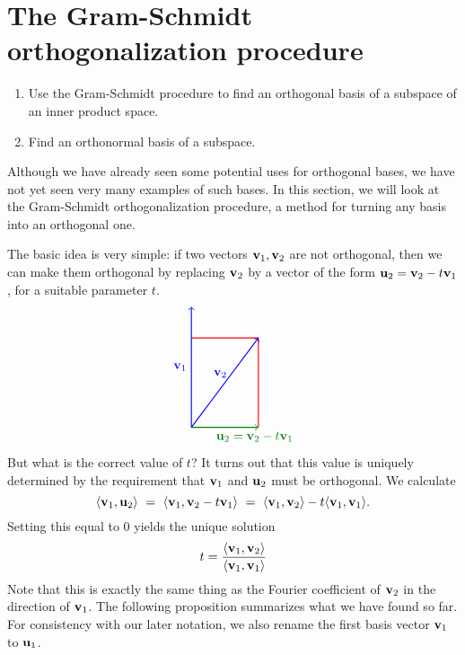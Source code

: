 \section{The Gram-Schmidt orthogonalization procedure}
\label{sec:gram-schmidt}

\begin{outcome}
  \begin{enumerate}
  \item Use the Gram-Schmidt procedure to find an orthogonal basis
    of a subspace of an inner product space.
  \item Find an orthonormal basis of a subspace.
  \end{enumerate}
\end{outcome}

Although we have already seen some potential uses for orthogonal
bases, we have not yet seen very many examples of such bases. In this
section, we will look at the Gram-Schmidt orthogonalization procedure,
a method for turning any basis into an orthogonal one.

The basic idea is very simple: if two vectors $\vect{v}_1,\vect{v}_2$
are not orthogonal, then we can make them orthogonal by replacing
$\vect{v}_2$ by a vector of the form $\vect{u}_2 = \vect{v}_2 -
t\vect{v}_1$, for a suitable parameter $t$.
\begin{equation*}
  \begin{tikzpicture}[scale=1.25]
    \draw[thick,red] (1.5,0) -- (1.5,2) -- (0,2);
    \draw[thick,blue,->] (0,0) -- node[left]{$\vect{v}_1$} (0,2.7);
    \draw[thick,blue,->] (0,0) -- node[left, pos=0.6]{$\vect{v}_2$} (1.5,2);
    \draw[thick,green!50!black,->] (0,0) -- node[below right, pos=0.3]{$\vect{u}_2 = \vect{v}_2 - t\vect{v}_1$} (1.5,0);
  \end{tikzpicture}
\end{equation*}
But what is the correct value of $t$? It turns out that this value is
uniquely determined by the requirement that $\vect{v}_1$ and
$\vect{u}_2$ must be orthogonal. We calculate
\begin{equation*}
  \iprod{\vect{v}_1,\vect{u}_2}
  ~=~ \iprod{\vect{v}_1,\vect{v}_2-t\vect{v}_1}
  ~=~ \iprod{\vect{v}_1,\vect{v}_2}-t\iprod{\vect{v}_1,\vect{v}_1}.
\end{equation*}
Setting this equal to $0$ yields the unique solution
\begin{equation*}
  t = \frac{\iprod{\vect{v}_1,\vect{v}_2}}{\iprod{\vect{v}_1,\vect{v}_1}}
\end{equation*}
Note that this is exactly the same thing as the Fourier coefficient of
$\vect{v}_2$ in the direction of $\vect{v}_1$. The following
proposition summarizes what we have found so far. For consistency with
our later notation, we also rename the first basis vector $\vect{v}_1$
to $\vect{u}_1$.

